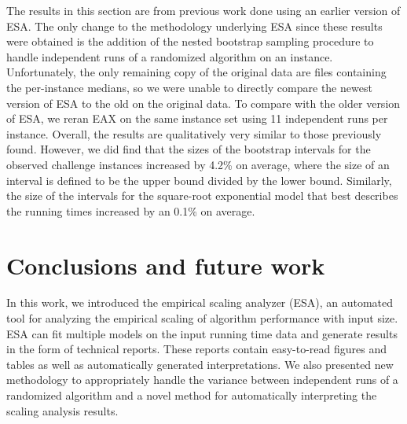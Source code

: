 \documentclass[aic]{iosart2x}
\begin{document}
The results in this section are from previous work done using an earlier version of ESA. The only change to the methodology underlying ESA since these results were obtained is the addition of the nested bootstrap sampling procedure to handle independent runs of a randomized algorithm on an instance.  Unfortunately, the only remaining copy of the original data are files containing the per-instance medians, so we were unable to directly compare the newest version of ESA to the old on the original data. To compare with the older version of ESA, we reran EAX on the same instance set using 11 independent runs per instance. Overall, the results are qualitatively very similar to those previously found. However, we did find that the sizes of the bootstrap intervals for the observed challenge instances increased by 4.2\% on average, where the size of an interval is defined to be the upper bound divided by the lower bound. Similarly, the size of the intervals for the square-root exponential model that best describes the running times increased by an 0.1\% on average. 

\section{Conclusions and future work}
\label{sec:Conclusion}

In this work, we introduced the empirical scaling analyzer (ESA), an automated tool for analyzing the empirical scaling of algorithm performance with input size. ESA can fit multiple models on the input running time data and generate results in the form of technical reports. These reports contain easy-to-read figures and tables as well as automatically generated interpretations. We also presented new methodology to appropriately handle the variance between independent runs of a randomized algorithm and a novel method for automatically interpreting the scaling analysis results.  
\end{document}
